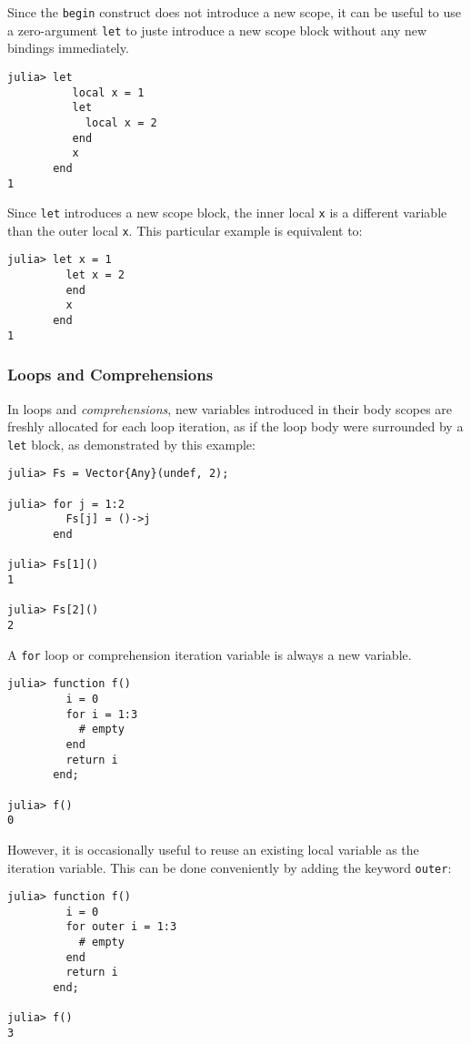 \documentclass[
]{article}
\begin{document}
Since the \texttt{begin} construct does not introduce a new scope, it
can be useful to use a zero-argument \texttt{let} to juste introduce a
new scope block without any new bindings immediately.

\begin{verbatim}
julia> let
          local x = 1
          let
            local x = 2
          end
          x
       end
1
\end{verbatim}

Since \texttt{let} introduces a new scope block, the inner local
\texttt{x} is a different variable than the outer local \texttt{x}. This
particular example is equivalent to:

\begin{verbatim}
julia> let x = 1
         let x = 2
         end
         x
       end
1
\end{verbatim}

\hypertarget{loops-and-comprehensions}{%
\subsubsection{Loops and
Comprehensions}\label{loops-and-comprehensions}}

In loops and \emph{comprehensions}, new variables introduced in their
body scopes are freshly allocated for each loop iteration, as if the
loop body were surrounded by a \texttt{let} block, as demonstrated by
this example:

\begin{verbatim}
julia> Fs = Vector{Any}(undef, 2);

julia> for j = 1:2
         Fs[j] = ()->j
       end

julia> Fs[1]()
1

julia> Fs[2]()
2
\end{verbatim}

A \texttt{for} loop or comprehension iteration variable is always a new
variable.

\begin{verbatim}
julia> function f()
         i = 0
         for i = 1:3
           # empty
         end
         return i
       end;

julia> f()
0
\end{verbatim}

However, it is occasionally useful to reuse an existing local variable
as the iteration variable. This can be done conveniently by adding the
keyword \texttt{outer}:

\begin{verbatim}
julia> function f()
         i = 0
         for outer i = 1:3
           # empty
         end
         return i
       end;

julia> f()
3
\end{verbatim}
\end{document}
